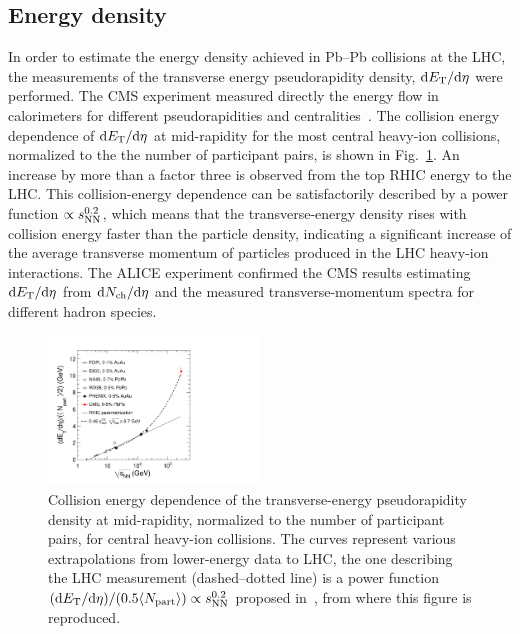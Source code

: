 \subsection{Energy density}
\label{subsecks:energydensity}

In order to estimate the energy density achieved in Pb--Pb collisions at the LHC, the measurements of the transverse energy pseudorapidity density, ${\rm d}E_{\rm T}/{\rm d}\eta$ were performed. The CMS experiment measured directly the energy flow in calorimeters for different pseudorapidities and centralities~\cite{Chatrchyan:2012mb}. The collision energy dependence of ${\rm d}E_{\rm T}/{\rm d}\eta$ at mid-rapidity for the most central heavy-ion collisions, normalized to the the number of participant pairs, is shown in Fig.~\ref{figks:ETvsEnerg}. An increase by more than a factor three is observed from the top RHIC energy to the LHC. This collision-energy dependence can be satisfactorily described by a power function $\propto s_{\rm NN}^{0.2}$, which means that the transverse-energy density rises with collision energy faster than the particle density, indicating a significant increase of the average transverse momentum of particles produced in the LHC heavy-ion interactions. The ALICE experiment confirmed the CMS results estimating ${\rm d}E_{\rm T}/{\rm d}\eta$ from ${\rm d}N_{\rm ch}/{\rm d}\eta$ and the measured transverse-momentum spectra for different hadron species.

\begin{figure}
\centering
\includegraphics[width=0.5\textwidth]{ksfigures/CMSETvsEnerg.pdf}
\caption{Collision energy dependence of the transverse-energy pseudorapidity density at mid-rapidity, normalized to the number of participant pairs, for central heavy-ion collisions. The curves represent various extrapolations from lower-energy data to LHC, the one describing the LHC measurement (dashed--dotted line) is a power function $({\rm d}E_{\rm T}/{\rm d}\eta)/(0.5 \langle N_{\rm part} \rangle) \propto s_{\rm NN}^{0.2}$ proposed in~\cite{Chatrchyan:2012mb}, from where this figure is reproduced.}
\label{figks:ETvsEnerg}
\end{figure}

